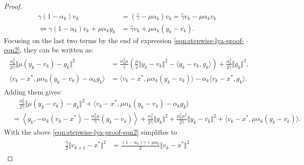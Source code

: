 \documentclass[12pt]{article}
\begin{document}
\begin{proof}
\begin{align*}
            \gamma(1 - \alpha_k) v_k &= 
            (\hat \gamma  - \mu \alpha_k)v_k
            = \hat \gamma v_k - \mu\alpha_k v_k
            \\
            \iff 
            \gamma(1 - \alpha_k) v_k + \mu \alpha_k y_k
            &= 
            \hat \gamma v_k + \mu \alpha_k(y_k - v_k). 
        \end{align*}
        Focusing on the last two terms by the end of expression \eqref{eqn:stepwise-lya-proof-eqn2}, they can be written as: 
        \begin{align}\label{eqn:stepwise-lya-proof-eqn2.1}\begin{split}
            \frac{\alpha^2_k}{2\hat \gamma} 
            \Vert \mu(y_k - v_k) - g_k\Vert^2
            & = 
            \frac{\alpha_k^2\mu}{\hat \gamma}
            \left(
                \frac{\mu}{2}\Vert y_k - v_k\Vert^2 
                - \langle y_k - v_k, g_k\rangle
            \right)
            + \frac{\alpha_k^2}{2\hat \gamma}\Vert g_k\Vert^2, 
            \\
            \langle v_k - x^*, \mu \alpha_k(y_k - v_k) - \alpha_k g_k\rangle
            &= 
            \langle v_k - x^*, \mu\alpha_k(y_k - v_k)\rangle 
            - \alpha_k \langle v_k - x^*, g_k\rangle. 
        \end{split} %
        \end{align}
        Adding them gives: 
        {\small
        \begin{align*}
            & \quad 
            \frac{\alpha^2_k}{2\hat \gamma} 
            \Vert \mu(y_k - v_k) - g_k\Vert^2
            + 
            \langle v_k - x^*, \mu \alpha_k(y_k - v_k) - \alpha_k g_k\rangle
            \\
            &= 
            \left\langle g_k, 
                - \alpha_k(v_k - x^*) 
                - \frac{\alpha_k^2\mu}{\hat \gamma}(y_k - v_k)
            \right\rangle
            + \frac{\alpha_k^2}{2\hat \gamma}\Vert g_k\Vert^2
            + \frac{\alpha_k^2 \mu^2}{2\hat \gamma}\Vert y_k - v_k\Vert^2
            + \langle v_k - x^*, \mu\alpha_k(y_k - v_k)\rangle. 
        \end{align*}
        }
        With the above \eqref{eqn:stepwise-lya-proof-eqn2} simplifies to 
        {\small
        \begin{align}\label{expr:stepwise-lya-expr2.2}
        \begin{split}
            \frac{\hat \gamma}{2}\Vert v_{k + 1} - x^*\Vert^2 
            &=
            \frac{(1 - \alpha_k)\gamma + \mu \alpha_k}{2} \Vert v_k - x^*\Vert^2

\end{split}
\end{align}}
\end{proof}
\end{document}
